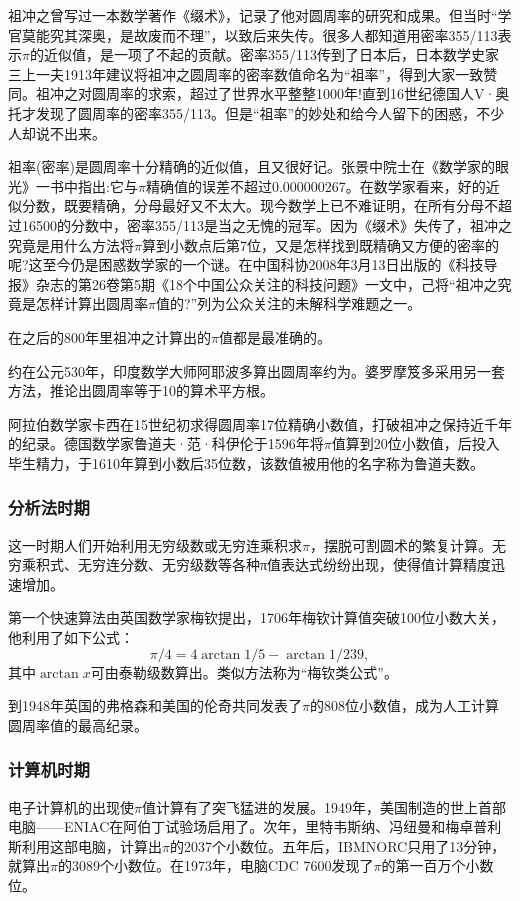 \documentclass[12pt,a4paper]{ctexart}
\begin{document}
	祖冲之曾写过一本数学著作《缀术》，记录了他对圆周率的研究和成果。但当时“学官莫能究其深奥，是故废而不理”，以致后来失传。很多人都知道用密率355/113表示$\pi$的近似值，是一项了不起的贡献。密率355/113传到了日本后，日本数学史家三上一夫1913年建议将祖冲之圆周率的密率数值命名为“祖率”，得到大家一致赞同。祖冲之对圆周率的求索，超过了世界水平整整1000年!直到16世纪德国人V·奥托才发现了圆周率的密率355/113。但是“祖率”的妙处和给今人留下的困惑，不少人却说不出来。
	
	祖率(密率)是圆周率十分精确的近似值，且又很好记。张景中院士在《数学家的眼光》一书中指出:它与$\pi$精确值的误差不超过0.000000267。在数学家看来，好的近似分数，既要精确，分母最好又不太大。现今数学上已不难证明，在所有分母不超过16500的分数中，密率355/113是当之无愧的冠军。因为《缀术》失传了，祖冲之究竟是用什么方法将$\pi$算到小数点后第7位，又是怎样找到既精确又方便的密率的呢?这至今仍是困惑数学家的一个谜。在中国科协2008年3月13日出版的《科技导报》杂志的第26卷第5期《18个中国公众关注的科技问题》一文中，己将“祖冲之究竟是怎样计算出圆周率$\pi$值的?”列为公众关注的未解科学难题之一\cite{RN21}。
	
	在之后的800年里祖冲之计算出的$\pi$值都是最准确的。
	
	约在公元530年，印度数学大师阿耶波多算出圆周率约为。婆罗摩笈多采用另一套方法，推论出圆周率等于10的算术平方根。
	
	阿拉伯数学家卡西在15世纪初求得圆周率17位精确小数值，打破祖冲之保持近千年的纪录。德国数学家鲁道夫·范·科伊伦于1596年将$\pi$值算到20位小数值，后投入毕生精力，于1610年算到小数后35位数，该数值被用他的名字称为鲁道夫数。
	\subsubsection{分析法时期}
	这一时期人们开始利用无穷级数或无穷连乘积求$\pi$，摆脱可割圆术的繁复计算。无穷乘积式、无穷连分数、无穷级数等各种π值表达式纷纷出现，使得值计算精度迅速增加。
	
	第一个快速算法由英国数学家梅钦提出，1706年梅钦计算值突破100位小数大关，他利用了如下公式：\begin{equation}\pi/4=4\arctan1/5-\arctan1/239,\end{equation}其中$\arctan{x}$可由泰勒级数算出。类似方法称为“梅钦类公式”。
	
	到1948年英国的弗格森和美国的伦奇共同发表了$\pi$的808位小数值，成为人工计算圆周率值的最高纪录\cite{RN21}。
	\subsubsection{计算机时期}
	电子计算机的出现使$\pi$值计算有了突飞猛进的发展。1949年，美国制造的世上首部电脑——ENIAC在阿伯丁试验场启用了。次年，里特韦斯纳、冯纽曼和梅卓普利斯利用这部电脑，计算出$\pi$的2037个小数位。五年后，IBMNORC只用了13分钟，就算出$\pi$的3089个小数位。在1973年，电脑CDC 7600发现了$\pi$的第一百万个小数位。
	
\end{document}
